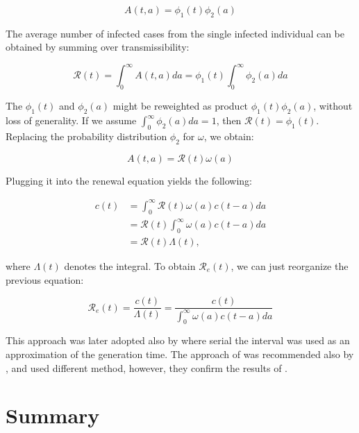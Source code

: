 \documentclass[
  digital, %
  oneside, %
  lof,     %
  lot,     %
]{fithesis4}
\begin{document}
\begin{equation}
A(t, a) = \phi_1(t) \phi_2(a)
\end{equation}

The average number of infected cases from the single infected individual can be obtained by summing over transmissibility:

\begin{equation}
  \mathcal{R}(t) = \int^{\infty}_0 A(t, a) da = \phi_1(t) \int^{\infty}_0 \phi_2(a) da
\end{equation}

The $\phi_1(t)$ and $\phi_2(a)$ might be reweighted as product $\phi_1(t) \phi_2(a)$, without loss of generality. 
If we assume $\int^{\infty}_0 \phi_2(a) da = 1$, then $\mathcal{R}(t) = \phi_1(t)$.
Replacing the probability distribution $\phi_2$ for $\omega$, we obtain:

\begin{equation}
A(t, a) = \mathcal{R}(t) \omega(a)
\end{equation}

\noindent
Plugging it into the renewal equation yields the following:

\begin{equation}
  \begin{split}
    c(t) & = \int^{\infty}_0 \mathcal{R}(t) \omega(a) c(t - a) da \\
    & = \mathcal{R}(t) \int^{\infty}_0 \omega(a) c(t - a) da\\
    & = \mathcal{R}(t) \Lambda(t),    
  \end{split}
\end{equation}

\noindent
where $\Lambda(t)$ denotes the integral.
To obtain $\mathcal{R}_e(t)$, we can just reorganize the previous equation:

\begin{equation}\label{eq:fraser-Re}
  \mathcal{R}_e(t) = \frac{c(t)}{\Lambda(t)} = \frac{c(t)}{\int^{\infty}_0 \omega(a) c(t - a) da}
\end{equation}

This approach was later adopted also by \cite{cori2013} where serial the interval was used as an approximation of the generation time.
The approach of \cite{cori2013} was recommended also by \cite{gostic2020}, and \cite{hasan2020} used different method, however, they confirm the results of \cite{cori2013}.


\section{Summary}
\end{document}
